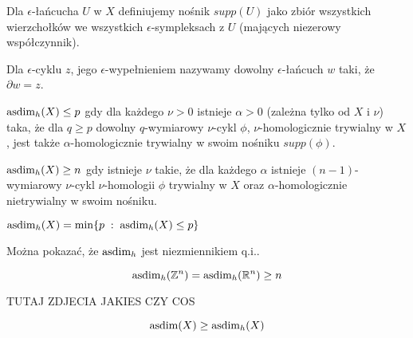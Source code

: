 Dla $\epsilon$-łańcucha $U$ w $X$ definiujemy nośnik $supp(U)$ jako zbiór wszystkich wierzchołków we wszystkich $\epsilon$-sympleksach z $U$ (mających niezerowy współczynnik).

Dla $\epsilon$-cyklu $z$, jego $\epsilon$-wypełnieniem nazywamy dowolny $\epsilon$-łańcuch $w$ taki, że $\partial w=z$.


\begin{center}
\end{center}

\begin{definition}{}{}
  $\operatorname{asdim}_h(X)\leq p$ gdy dla każdego $\nu>0$ istnieje $\alpha>0$ (zależna tylko od $X$ i $\nu$) taka, że dla $q\geq p$ dowolny $q$-wymiarowy $\nu$-cykl $\phi$, $\nu$-homologicznie trywialny w $X$, jest także $\alpha$-homologicznie trywialny w swoim nośniku $supp(\phi)$.

  $\operatorname{asdim}_h(X)\geq n$ gdy istnieje $\nu$ takie, że dla każdego $\alpha$ istnieje $(n-1)$-wymiarowy $\nu$-cykl $\nu$-homologii $\phi$ trywialny w $X$ oraz $\alpha$-homologicznie nietrywialny w swoim nośniku.

  $\operatorname{asdim}_h(X)=\min \{p\;:\;\operatorname{asdim}_h(X)\leq p\}$
\end{definition}

Można pokazać, że $\operatorname{asdim}_h$ jest niezmiennikiem q.i..



\begin{theorem}{}{}
  $$\operatorname{asdim}_h(\mathbb{Z}^n)=\operatorname{asdim}_h(\mathbb{R}^n)\geq n$$
\end{theorem}

{\large\color{red}TUTAJ ZDJECIA JAKIES CZY COS}

\begin{theorem}{}{}
  $$\operatorname{asdim}(X)\geq\operatorname{asdim}_h(X)$$
\end{theorem}





